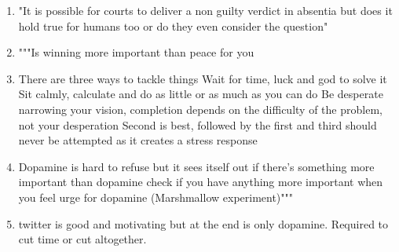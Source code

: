 \documentclass{article}
\begin{document}
\begin{enumerate}

\item "It is possible for courts to deliver a non guilty verdict in absentia but does it hold true for humans too or do they even consider the question"

\item """Is winning more important than peace for you

\item There are three ways to tackle things 
Wait for time, luck and god to solve it
Sit calmly, calculate and do as little or as much as you can do
Be desperate narrowing your vision, completion depends on the difficulty of the problem, not your desperation
Second is best, followed by the first and third should never be attempted as it creates a stress response 

\item Dopamine is hard to refuse but it sees itself out if there's something more important than dopamine check if you have anything more important when you feel urge for dopamine (Marshmallow experiment)"""
\item twitter is good and motivating but at the end is only dopamine. Required to cut time or cut altogether. 
\end{enumerate}
\end{document}
